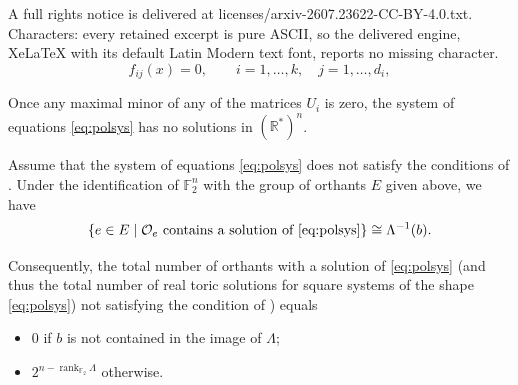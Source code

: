\documentclass[10pt,a4paper]{amsart}
\def\FF{\mathbb{F}}
\def\RR{\mathbb{R}}
\newcommand{\setdes}[2]{\left\{#1\;\middle|\;#2\right\}}
\begin{document}
A full rights notice is delivered at licenses/arxiv-2607.23622-CC-BY-4.0.txt. Characters: every retained excerpt is pure ASCII, so the delivered engine, XeLaTeX with its default Latin Modern text font, reports no missing character.
\begin{equation}
  \label{eq:polsys}
  f_{ij}(x)=0, \qquad i=1,\ldots,k,\quad j=1,\ldots,d_i,
\end{equation}

\begin{lemma}\label{ltriv}
  Once any maximal minor of any of the matrices $U_i$ is zero, the
  system of equations \eqref{eq:polsys} has no solutions in $(\RR^{*})^n$.
\end{lemma}

\begin{theorem}\label{thm:rootcounting}
  Assume that the system of equations \eqref{eq:polsys} does not
  satisfy the conditions of . Under the identification of
  $\FF_2^n$ with the group of orthants $E$ given above, we have
  \[\setdes{e\in E}{\mathcal{O}_e\text{ contains a solution of \eqref{eq:polsys}}} \cong \Lambda^{-1}(b).\]

  Consequently, the total number of orthants with a solution of
  \eqref{eq:polsys} (and thus the total number of real toric solutions
  for square systems of the shape \eqref{eq:polsys}) not satisfying the
  condition of ) equals
  \begin{itemize}
  \item $0$ if $b$ is not contained in the image of $\Lambda$;
  \item $2^{n-\operatorname{rank}_{\mathbb F_2}\Lambda}$ otherwise.
  \end{itemize}
\end{theorem}
\end{document}
